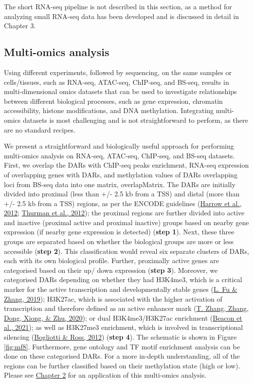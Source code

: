 \documentclass[12pt,twoside]{reedthesis}
\begin{document}
The short RNA-seq pipeline is not described in this section, as a method
for analyzing small RNA-seq data has been developed and is discussed in
detail in Chapter 3.

\hypertarget{m3.7}{%
\subsection*{Multi-omics analysis}\label{m3.7}}

Using different experiments, followed by sequencing, on the same samples
or cells/tissues, such as RNA-seq, ATAC-seq, ChIP-seq, and BS-seq,
results in multi-dimensional omics datasets that can be used to
investigate relationships between different biological processes, such
as gene expression, chromatin accessibility, histone modifications, and
DNA methylation. Integrating multi-omics datasets is most challenging
and is not straightforward to perform, as there are no standard recipes.

We present a straightforward and biologically useful approach for
performing multi-omics analysis on RNA-seq, ATAC-seq, ChIP-seq, and
BS-seq datasets. First, we overlap the DARs with ChIP-seq peaks
enrichment, RNA-seq expression of overlapping genes with DARs, and
methylation values of DARs overlapping loci from BS-seq data into one
matrix, overlapMatrix. The DARs are initially divided into proximal
(less than +/- 2.5 kb from a TSS) and distal (more than +/- 2.5 kb from
a TSS) regions, as per the ENCODE guidelines (\protect\hyperlink{ref-harrow2012}{Harrow et al., 2012}; \protect\hyperlink{ref-thurman2012}{Thurman et al., 2012}); the proximal regions are further divided into active and
inactive (proximal active and proximal inactive) groups based on nearby
gene expression (if nearby gene expression is detected) (\textbf{step 1}).
Next, these three groups are separated based on whether the biological
groups are more or less accessible (\textbf{step 2}). This classification
would reveal six separate clusters of DARs, each with its own biological
profile. Further, proximally active genes are categorised based on their
up/ down expression (\textbf{step 3}). Moreover, we categorised DARs
depending on whether they had H3K4me3, which is a critical marker for
the active transcription and developmentally stable genes (\protect\hyperlink{ref-fu2019}{L. Fu \& Zhang, 2019});
H3K27ac, which is associated with the higher activation of transcription
and therefore defined as an active enhancer mark (\protect\hyperlink{ref-zhang2020}{T. Zhang, Zhang, Dong, Xiong, \& Zhu, 2020}); or dual
H3K4me3/H3K27ac enrichment (\protect\hyperlink{ref-beacon2021}{Beacon et al., 2021}); as well as H3K27me3
enrichment, which is involved in transcriptional silencing
(\protect\hyperlink{ref-bogliotti2012}{Bogliotti \& Ross, 2012}) (\textbf{step 4}). The schematic is shown in Figure
\ref{fig:mf8}. Furthermore, gene ontology and TF motif enrichment
analysis can be done on these categorised DARs. For a more in-depth
understanding, all of the regions can be further classified based on
their methylation state (high or low). Please see \protect\hyperlink{chapter2}{Chapter 2}
for an application of this multi-omics analysis.
\end{document}
